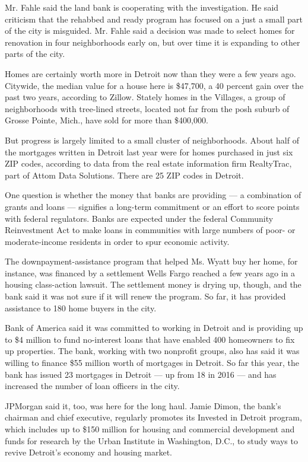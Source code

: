Mr. Fahle said the land bank is cooperating with the investigation. He
said criticism that the rehabbed and ready program has focused on a just
a small part of the city is misguided. Mr. Fahle said a decision was
made to select homes for renovation in four neighborhoods early on, but
over time it is expanding to other parts of the city.

Homes are certainly worth more in Detroit now than they were a few years
ago. Citywide, the median value for a house here is \$47,700, a 40
percent gain over the past two years, according to Zillow. Stately homes
in the Villages, a group of neighborhoods with tree-lined streets,
located not far from the posh suburb of Grosse Pointe, Mich., have sold
for more than \$400,000.

But progress is largely limited to a small cluster of neighborhoods.
About half of the mortgages written in Detroit last year were for homes
purchased in just six ZIP codes, according to data from the real estate
information firm RealtyTrac, part of Attom Data Solutions. There are 25
ZIP codes in Detroit.

One question is whether the money that banks are providing --- a
combination of grants and loans --- signifies a long-term commitment or
an effort to score points with federal regulators. Banks are expected
under the federal Community Reinvestment Act to make loans in
communities with large numbers of poor- or moderate-income residents in
order to spur economic activity.

The downpayment-assistance program that helped Ms. Wyatt buy her home,
for instance, was financed by a settlement Wells Fargo reached a few
years ago in a housing class-action lawsuit. The settlement money is
drying up, though, and the bank said it was not sure if it will renew
the program. So far, it has provided assistance to 180 home buyers in
the city.

Bank of America said it was committed to working in Detroit and is
providing up to \$4 million to fund no-interest loans that have enabled
400 homeowners to fix up properties. The bank, working with two
nonprofit groups, also has said it was willing to finance \$55 million
worth of mortgages in Detroit. So far this year, the bank has issued 23
mortgages in Detroit --- up from 18 in 2016 --- and has increased the
number of loan officers in the city.

JPMorgan said it, too, was here for the long haul. Jamie Dimon, the
bank's chairman and chief executive, regularly promotes its Invested in
Detroit program, which includes up to \$150 million for housing and
commercial development and funds for research by the Urban Institute in
Washington, D.C., to study ways to revive Detroit's economy and housing
market.

